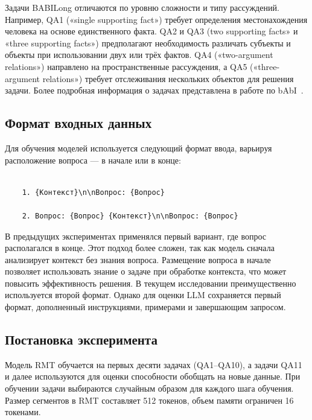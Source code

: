 Задачи BABILong отличаются по уровню сложности и типу рассуждений. Например, QA1 («single supporting fact») требует определения местонахождения человека на основе единственного факта. QA2 и QA3 (two supporting facts» и «three supporting facts») предполагают необходимость различать субъекты и объекты при использовании двух или трёх фактов. QA4 («two-argument relations») направлено на пространственные рассуждения, а QA5 («three-argument relations») требует отслеживания нескольких объектов для решения задачи. Более подробная информация о задачах представлена в работе по bAbI~\cite{WestonBCM15}.

\subsection{Формат входных данных}

Для обучения моделей используется следующий формат ввода, варьируя расположение вопроса — в начале или в конце:

\begin{verbatim} 
    
    1. {Контекст}\n\nВопрос: {Вопрос} 
    
    2. Вопрос: {Вопрос} {Контекст}\n\nВопрос: {Вопрос} 

\end{verbatim}

В предыдущих экспериментах применялся первый вариант, где вопрос располагался в конце. Этот подход более сложен, так как модель сначала анализирует контекст без знания вопроса. Размещение вопроса в начале позволяет использовать знание о задаче при обработке контекста, что может повысить эффективность решения. В текущем исследовании преимущественно используется второй формат. Однако для оценки LLM сохраняется первый формат, дополненный инструкциями, примерами и завершающим запросом.


\subsection{Постановка эксперимента}

Модель RMT обучается на первых десяти задачах (QA1–QA10), а задачи QA11 и далее используются для оценки способности обобщать на новые данные. При обучении задачи выбираются случайным образом для каждого шага обучения. Размер сегментов в RMT составляет 512 токенов, объем памяти ограничен 16 токенами.

